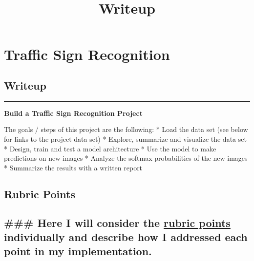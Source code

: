 \documentclass[11pt]{article}
\title{Writeup}
\begin{document}
    
    
    \maketitle
    
    

    
    \hypertarget{traffic-sign-recognition}{%
\section{\texorpdfstring{\textbf{Traffic Sign
Recognition}}{Traffic Sign Recognition}}\label{traffic-sign-recognition}}

\hypertarget{writeup}{%
\subsection{Writeup}\label{writeup}}

\begin{center}\rule{0.5\linewidth}{\linethickness}\end{center}

\textbf{Build a Traffic Sign Recognition Project}

The goals / steps of this project are the following: * Load the data set
(see below for links to the project data set) * Explore, summarize and
visualize the data set * Design, train and test a model architecture *
Use the model to make predictions on new images * Analyze the softmax
probabilities of the new images * Summarize the results with a written
report

\hypertarget{rubric-points}{%
\subsection{Rubric Points}\label{rubric-points}}

\hypertarget{here-i-will-consider-the-rubric-points-individually-and-describe-how-i-addressed-each-point-in-my-implementation.}{%
\subsection{\texorpdfstring{\#\#\# Here I will consider the
\href{https://review.udacity.com/\#!/rubrics/481/view}{rubric points}
individually and describe how I addressed each point in my
implementation.}{\#\#\# Here I will consider the rubric points individually and describe how I addressed each point in my implementation.}}\label{here-i-will-consider-the-rubric-points-individually-and-describe-how-i-addressed-each-point-in-my-implementation.}}
\end{document}
